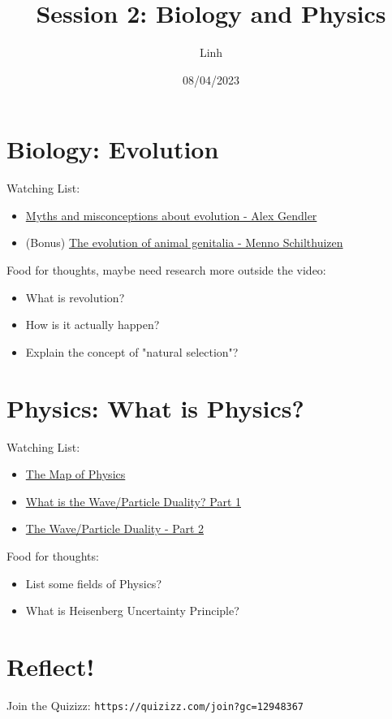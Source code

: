 \documentclass{article}
\title{Session 2: Biology and Physics}
\author{Linh}
\date{08/04/2023}
\begin{document}
    \maketitle
    \section{Biology: Evolution}

    Watching List:

    \begin{itemize}
    \item \href{https://youtu.be/mZt1Gn0R22Q}{Myths and misconceptions about evolution - Alex Gendler}
    \item (Bonus) \href{https://youtu.be/vcPJkz-D5II}{The evolution of animal genitalia - Menno Schilthuizen}
    \end{itemize}
    
    Food for thoughts, maybe need research more outside the video:
    
    \begin{itemize}
        \item What is revolution?
        \item How is it actually happen?
        \item Explain the concept of "natural selection"?
    \end{itemize}

    \section{Physics: What is Physics?}

    Watching List:

    \begin{itemize}
        \item \href{https://youtu.be/ZihywtixUYo}{The Map of Physics}
        \item \href{https://youtu.be/Q_h4IoPJXZw}{What is the Wave/Particle Duality? Part 1}
        \item \href{https://youtu.be/_riIY-v2Ym8}{The Wave/Particle Duality - Part 2}
    \end{itemize}

    Food for thoughts:

    \begin{itemize}
        \item List some fields of Physics?
        \item What is Heisenberg Uncertainty Principle?
        \end{itemize}
    
    \section{Reflect!}
    
    Join the Quizizz: \texttt{https://quizizz.com/join?gc=12948367}
    
\end{document}
